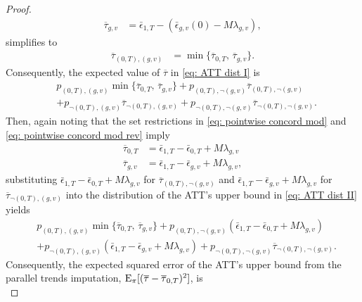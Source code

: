 \documentclass[twoside,11pt]{article}
\begin{document}
\begin{proof}
\begin{align*}
\overline{\tau}_{g,v} & = \bar{\epsilon}_{1,T} - \left(\bar{\epsilon}_{g,v}(0) - M \lambda_{g,v}\right),
\end{align*}
simplifies to
\begin{align*}
\overline{\tau}_{(0,T),(g,v)} & = \min\{\overline{\tau}_{0,T}, \, \overline{\tau}_{g,v}\}.
\end{align*}
Consequently, the expected value of $\overline{\tau}$ in \eqref{eq: ATT dist I} is
\begin{equation} \label{eq: ATT dist II}
\begin{split}
& p_{(0,T),(g,v)} \min\{\overline{\tau}_{0,T}, \, \overline{\tau}_{g,v}\} + p_{(0,T),\neg(g,v)} \overline{\tau}_{(0,T),\neg(g,v)} \\ 
& + p_{\neg(0,T),(g,v)} \overline{\tau}_{\neg(0,T),(g,v)} + p_{\neg(0,T),\neg(g,v)} \overline{\tau}_{\neg(0,T),\neg(g,v)}.
\end{split}
\end{equation}
Then, again noting that the set restrictions in \eqref{eq: pointwise concord mod} and \eqref{eq: pointwise concord mod rev} imply
\begin{align*}
\overline{\tau}_{0,T} & = \bar{\epsilon}_{1,T} - \bar{\epsilon}_{0,T} + M \lambda_{g,v} \\
\overline{\tau}_{g,v} & = \bar{\epsilon}_{1,T} - \bar{\epsilon}_{g,v} + M \lambda_{g,v},
\end{align*}
substituting $\bar{\epsilon}_{1,T} - \bar{\epsilon}_{0,T} + M \lambda_{g,v}$ for $\overline{\tau}_{(0,T),\neg(g,v)}$ and $\bar{\epsilon}_{1,T} - \bar{\epsilon}_{g,v} + M \lambda_{g,v}$ for $\overline{\tau}_{\neg(0,T),(g,v)}$ into the distribution of the \textrm{ATT}'s upper bound in \eqref{eq: ATT dist II} yields
\begin{equation} \label{eq: ATT dist III}
\begin{split}
& p_{(0,T),(g,v)} \min\{\overline{\tau}_{0,T}, \, \overline{\tau}_{g,v}\} + p_{(0,T),\neg(g,v)} \left(\bar{\epsilon}_{1,T} - \bar{\epsilon}_{0,T} + M \lambda_{g,v}\right) \\ 
& + p_{\neg(0,T),(g,v)} \left(\bar{\epsilon}_{1,T} - \bar{\epsilon}_{g,v} + M \lambda_{g,v}\right) + p_{\neg(0,T),\neg(g,v)} \overline{\tau}_{\neg(0,T),\neg(g,v)}.
\end{split}
\end{equation}
Consequently, the expected squared error of the \textrm{ATT}'s upper bound from the parallel trends imputation, $\operatorname{\rm{E}}_{\pi}[(\overline{\tau} - \overline{\tau}_{0,T})^2]$, is
\begin{equation} \label{eq: UB exp squared error I}

\end{equation}
\end{proof}
\end{document}
